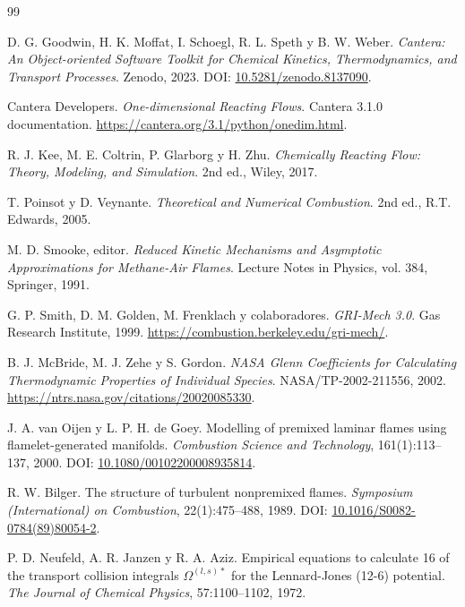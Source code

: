 \documentclass[12pt,a4paper]{article}
\begin{document}
\clearpage
{}
{}
\begin{thebibliography}{99}

D. G. Goodwin, H. K. Moffat, I. Schoegl, R. L. Speth y B. W. Weber.
\newblock \textit{Cantera: An Object-oriented Software Toolkit for Chemical Kinetics, Thermodynamics, and Transport Processes}.
\newblock Zenodo, 2023. DOI: \href{https://doi.org/10.5281/zenodo.8137090}{10.5281/zenodo.8137090}.

Cantera Developers.
\newblock \textit{One-dimensional Reacting Flows}. Cantera 3.1.0 documentation.
\newblock \url{https://cantera.org/3.1/python/onedim.html}.

R. J. Kee, M. E. Coltrin, P. Glarborg y H. Zhu.
\newblock \textit{Chemically Reacting Flow: Theory, Modeling, and Simulation}.
\newblock 2nd ed., Wiley, 2017.

T. Poinsot y D. Veynante.
\newblock \textit{Theoretical and Numerical Combustion}.
\newblock 2nd ed., R.T. Edwards, 2005.

M. D. Smooke, editor.
\newblock \textit{Reduced Kinetic Mechanisms and Asymptotic Approximations for Methane-Air Flames}.
\newblock Lecture Notes in Physics, vol. 384, Springer, 1991.

G. P. Smith, D. M. Golden, M. Frenklach y colaboradores.
\newblock \textit{GRI-Mech 3.0}.
\newblock Gas Research Institute, 1999. \url{https://combustion.berkeley.edu/gri-mech/}.

B. J. McBride, M. J. Zehe y S. Gordon.
\newblock \textit{NASA Glenn Coefficients for Calculating Thermodynamic Properties of Individual Species}.
\newblock NASA/TP-2002-211556, 2002. \url{https://ntrs.nasa.gov/citations/20020085330}.

J. A. van Oijen y L. P. H. de Goey.
\newblock Modelling of premixed laminar flames using flamelet-generated manifolds.
\newblock \textit{Combustion Science and Technology}, 161(1):113--137, 2000. DOI: \href{https://doi.org/10.1080/00102200008935814}{10.1080/00102200008935814}.

R. W. Bilger.
\newblock The structure of turbulent nonpremixed flames.
\newblock \textit{Symposium (International) on Combustion}, 22(1):475--488, 1989. DOI: \href{https://doi.org/10.1016/S0082-0784(89)80054-2}{10.1016/S0082-0784(89)80054-2}.

P. D. Neufeld, A. R. Janzen y R. A. Aziz.
\newblock Empirical equations to calculate 16 of the transport collision integrals $\Omega^{(l,s)\ast}$ for the Lennard-Jones (12-6) potential.
\newblock \textit{The Journal of Chemical Physics}, 57:1100--1102, 1972.

\end{thebibliography}
\end{document}
